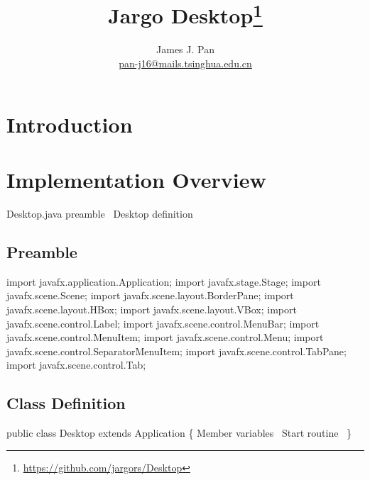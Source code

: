 \documentclass{article}
\title{Jargo Desktop\footnote{
    \url{https://github.com/jargors/Desktop}}}
\author{James J. Pan\\
  \small{\href{mailto:pan-j16@mails.tsinghua.edu.cn}{pan-j16@mails.tsinghua.edu.cn}}}
\def\nwendcode{\endtrivlist \endgroup}      %
\let\nwdocspar=\par
\begin{document}
\maketitle
\pagestyle{noweb}

\tableofcontents

\section{Introduction}
\label{sec:introduction}

\section{Implementation Overview}
\endmoddef{}
\LA{}Desktop.java preamble~{\nwtagstyle{}}\RA{}
\LA{}\code{}Desktop\edoc{} definition~{\nwtagstyle{}}\RA{}
\nwendcode{}\nwdocspar

\subsection{Preamble}
\nwenddocs{}\endmoddef{}
import javafx.application.Application;
import javafx.stage.Stage;
import javafx.scene.Scene;
import javafx.scene.layout.BorderPane;
import javafx.scene.layout.HBox;
import javafx.scene.layout.VBox;
import javafx.scene.control.Label;
import javafx.scene.control.MenuBar;
import javafx.scene.control.MenuItem;
import javafx.scene.control.Menu;
import javafx.scene.control.SeparatorMenuItem;
import javafx.scene.control.TabPane;
import javafx.scene.control.Tab;
\nwendcode{}\nwdocspar

\subsection{Class Definition}
\nwenddocs{}\endmoddef{}
public class Desktop extends Application \{
  \LA{}Member variables~{\nwtagstyle{}}\RA{}
  \LA{}Start routine~{\nwtagstyle{}}\RA{}
\}
\nwendcode{}\nwdocspar
\end{document}

